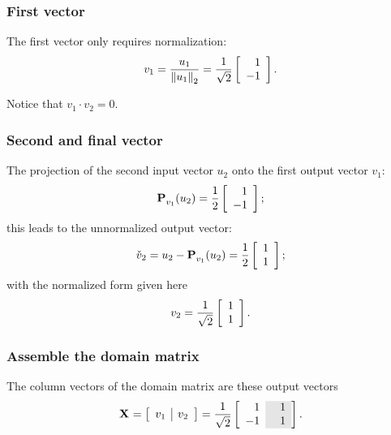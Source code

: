 \subsubsection{First vector}
The first vector only requires normalization:
\begin{equation}
  v_{1} = \frac{u_{1}}{\normt{u_{1}}} = \stwo
  \mat{r}{1\\-1}.
\end{equation}

Notice that $v_{1}\cdot v_{2}=0$.

\subsubsection{Second and final vector}
The projection of the second input vector $u_{2}$ onto the first output vector $v_{1}$:
\begin{equation}
  \pee{}_{v_{1}}(u_{2}) = \rtwo\mat{r}{1\\-1};
\end{equation}
this leads to the unnormalized output vector:
\begin{equation}
  \check{v}_{2}= u_{2} - \pee{}_{v_{1}}(u_{2}) = \rtwo\mat{r}{1\\1};
\end{equation}
with the normalized form given here
\begin{equation}
  v_{2} = \stwo \mat{r}{1\\1}.
  \label{eq:gs:a}
\end{equation}

\subsubsection{Assemble the domain matrix}
The column vectors of the domain matrix are these output vectors
\begin{equation}
  \X{} = \mat{c|c}{v_{1} & v_{2}} = \Xshade.
\end{equation}

